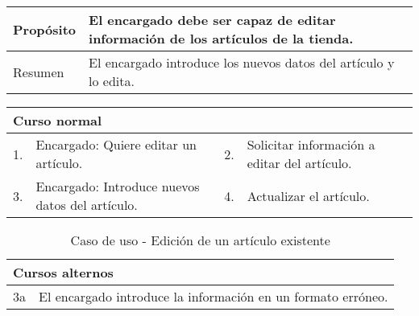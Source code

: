 \begin{table}[H]
	\centering
	\begin{tabular}{| m{} | m{} | m{} | m{} |}
		\hline
		Propósito & \multicolumn{3}{m{0.67\textwidth}|}{El encargado debe ser capaz de editar información de los artículos de la tienda.}   \\ 
		\hline
		Resumen & \multicolumn{3}{m{0.67\textwidth}|}{El encargado introduce los nuevos datos del artículo y lo edita.} \\ 
		\hline
	\end{tabular}
\end{table}


\begin{table}[H]
	\centering
	\begin{tabular}{| m{} | m{} | m{} | m{} |}
		\hline
		\multicolumn{4}{|m{0.9\textwidth}|}{Curso normal}     \\ 
		\hline
		1. & Encargado: Quiere editar un artículo. & 2. &  Solicitar información a editar del artículo.  \\ 
		\hline
		3. & Encargado: Introduce nuevos datos del artículo. & 4. & Actualizar el artículo. \\ 
		\hline
	\end{tabular}
\end{table}

\begin{table}[H]
	\centering
	\begin{tabular}{| m{} | m{} | m{} | m{} |}
		\hline
		\multicolumn{4}{|m{0.9\textwidth}|}{Cursos alternos}     \\ 
		\hline
		3a & \multicolumn{3}{m{0.67\textwidth}|}{El encargado introduce la información en un formato erróneo.} \\ 
		\hline
	\end{tabular}
	\caption{Caso de uso - Edición de un artículo existente}
\end{table}

\newpage


